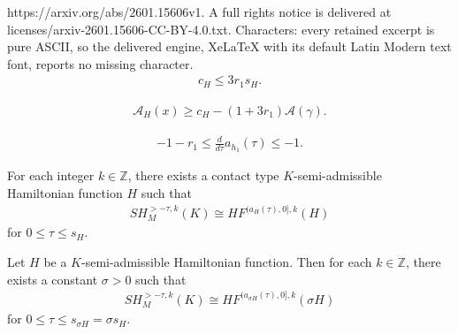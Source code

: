 \documentclass[10pt,a4paper]{amsart}
\newcommand{\ZZ}{{\mathbb Z}}
\begin{document}
https://arxiv.org/abs/2601.15606v1. A full rights notice is delivered at licenses/arxiv-2601.15606-CC-BY-4.0.txt. Characters: every retained excerpt is pure ASCII, so the delivered engine, XeLaTeX with its default Latin Modern text font, reports no missing character.
\begin{align}\label{chsh}
    c_H \leq 3r_1 s_H.
\end{align}

\begin{align}\label{ua}
    \mathcal{A}_H(x) \geq c_H-(1+3r_1) \mathcal{A}(\gamma).
\end{align}

    \begin{align}\label{bound}
       -1-r_1 \leq \frac{d}{d\tau}a_{h_1}(\tau) \leq -1.
    \end{align}

\begin{theorem}\label{hamiso}
For each integer $k \in \ZZ$, there exists a contact type $K$-semi-admissible Hamiltonian function $H$ such that 
    \begin{align*}
        SH^{>-\tau,k}_M(K) \cong HF^{(a_{H}(\tau),0],k}(H)
    \end{align*}
    for $0 \leq \tau \leq s_H$.
\end{theorem}

\begin{corollary}\label{hamisocoro}
    Let $H$ be a $K$-semi-admissible Hamiltonian function. Then for each $k \in \ZZ$, there exists a constant $\sigma >0$ such that
    \begin{align*}
        SH^{>-\tau,k}_M(K) \cong HF^{(a_{\sigma H}(\tau),0],k}(\sigma H)
    \end{align*}
    for $0 \leq \tau \leq s_{\sigma H} = \sigma s_H$.
\end{corollary}
\end{document}

